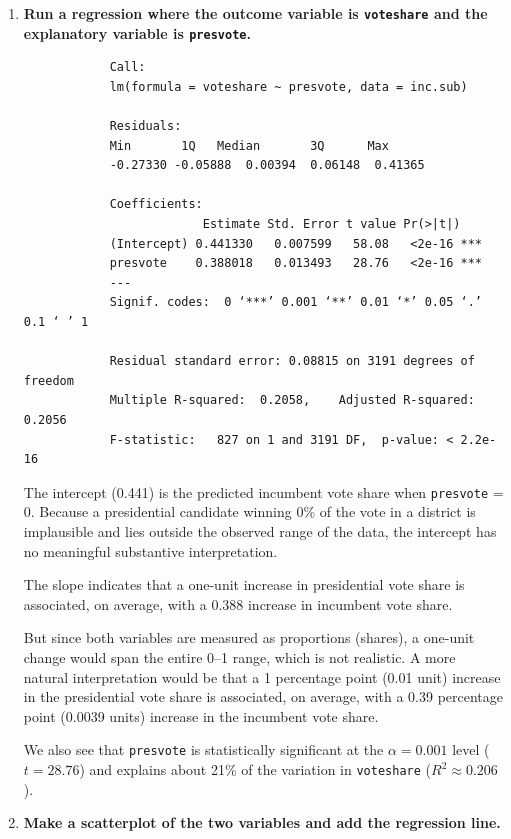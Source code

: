 \documentclass[12pt,letterpaper]{article}
\begin{document}
	\begin{enumerate}
		
		\item \textbf{Run a regression where the outcome variable is \texttt{voteshare} and the explanatory variable is \texttt{presvote}.} 
		
		
		
		\begin{verbatim}
			Call:
			lm(formula = voteshare ~ presvote, data = inc.sub)
			
			Residuals:
			Min       1Q   Median       3Q      Max 
			-0.27330 -0.05888  0.00394  0.06148  0.41365 
			
			Coefficients:
			             Estimate Std. Error t value Pr(>|t|)    
			(Intercept) 0.441330   0.007599   58.08   <2e-16 ***
			presvote    0.388018   0.013493   28.76   <2e-16 ***
			---
			Signif. codes:  0 ‘***’ 0.001 ‘**’ 0.01 ‘*’ 0.05 ‘.’ 0.1 ‘ ’ 1
			
			Residual standard error: 0.08815 on 3191 degrees of freedom
			Multiple R-squared:  0.2058,	Adjusted R-squared:  0.2056 
			F-statistic:   827 on 1 and 3191 DF,  p-value: < 2.2e-16
		\end{verbatim}
		
		\noindent The intercept (0.441) is the predicted incumbent vote share when
		\texttt{presvote} = 0. Because a presidential candidate winning 0\% of the vote
		in a district is implausible and lies outside the observed range of the data, the
		intercept has no meaningful substantive interpretation.
		
		\noindent The slope indicates that a one-unit increase in presidential vote share is associated, on average, with a 0.388 increase in incumbent vote share. 
		
		\noindent But since both variables are measured as proportions (shares), a one-unit change would span the entire 0–1 range, which is not realistic. A more natural interpretation would be that a 1 percentage point (0.01 unit) increase in the presidential vote share is associated, on average, with a 0.39 percentage point (0.0039 units) increase in the incumbent vote share.
		
		\noindent We also see that \texttt{presvote} is statistically significant at the
		$\alpha = 0.001$ level ($t = 28.76$) and explains about 21\% of the variation in
		\texttt{voteshare} ($R^2 \approx 0.206$).
		
		\newpage
		\item \textbf{Make a scatterplot of the two variables and add the regression line.} 
		\vspace{.5cm}
		 
			

\end{enumerate}
\end{document}
